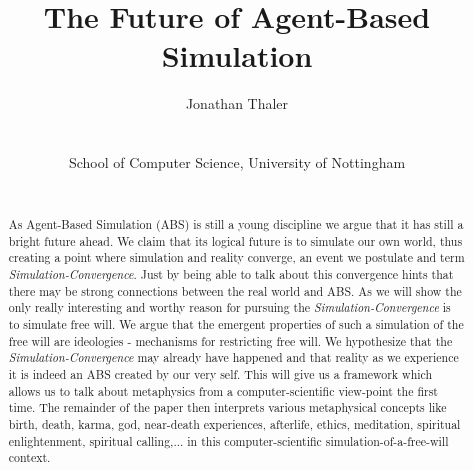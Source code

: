 \documentclass[a4paper, 10pt, conference]{../../templates/IEEEconf/IEEEconf}
\title{The Future of Agent-Based Simulation}
\author{
	Jonathan Thaler \\
	\email{jonathan.thaler@nottingham.ac.uk} \\
	\begin{affiliation}
		School of Computer Science, University of Nottingham
	\end{affiliation} \\
}
\begin{document}
\maketitle

\begin{abstract}
As Agent-Based Simulation (ABS) is still a young discipline we argue that it has still a bright future ahead. We claim that its logical future is to simulate our own world, thus creating a point where simulation and reality converge, an event we postulate and term \textit{Simulation-Convergence}. Just by being able to talk about this convergence hints that there may be strong connections between the real world and ABS. As we will show the only really interesting and worthy reason for pursuing the \textit{Simulation-Convergence} is to simulate free will. We argue that the emergent properties of such a simulation of the free will are ideologies - mechanisms for restricting free will. We hypothesize that the \textit{Simulation-Convergence} may already have happened and that reality as we experience it is indeed an ABS created by our very self. This will give us a framework which allows us to talk about metaphysics from a computer-scientific view-point the first time. The remainder of the paper then interprets various metaphysical concepts like birth, death, karma, god, near-death experiences, afterlife, ethics, meditation, spiritual enlightenment, spiritual calling,... in this computer-scientific simulation-of-a-free-will context.
\end{abstract}













\end{document}
